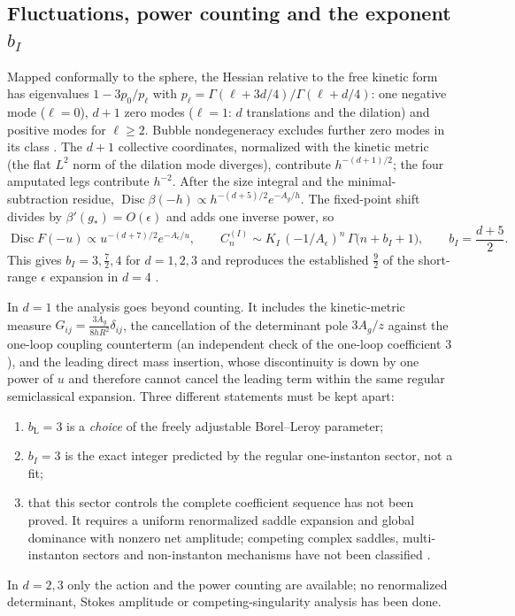\documentclass[11pt,a4paper]{article}
\numberwithin{equation}{section}
\newcommand{\Ae}{A_\epsilon}
\newcommand{\Ag}{A_g}
\newcommand{\bL}{b_{\mathrm L}}
\newcommand{\Disc}{\operatorname{Disc}}
\begin{document}
\subsection{\texorpdfstring{Fluctuations, power counting and the exponent $b_I$}{Fluctuations, power counting and the exponent b\_I}}
Mapped conformally to the sphere, the Hessian relative to the free kinetic form has
eigenvalues $1-3p_0/p_\ell$ with $p_\ell=\Gamma(\ell+3d/4)/\Gamma(\ell+d/4)$: one
negative mode ($\ell=0$), $d+1$ zero modes ($\ell=1$: $d$ translations and the dilation)
and positive modes for $\ell\ge2$. Bubble nondegeneracy excludes further zero modes in
its class \cite{Davila2013}. The $d+1$ collective coordinates, normalized with the
kinetic metric (the flat $L^2$ norm of the dilation mode diverges), contribute
$h^{-(d+1)/2}$; the four amputated legs contribute $h^{-2}$. After the size integral and
the minimal-subtraction residue, $\Disc\beta(-h)\propto h^{-(d+5)/2}e^{-\Ag/h}$. The
fixed-point shift divides by $\beta'(g_*)=O(\epsilon)$ and adds one inverse power, so
\begin{equation}
 \Disc F(-u)\propto u^{-(d+7)/2}e^{-\Ae/u},\qquad
 C_n^{(I)}\sim K_I\,(-1/\Ae)^n\,\Gamma\bigl(n+b_I+1\bigr),\qquad
 b_I=\frac{d+5}{2}.
 \label{eq:bI}
\end{equation}
This gives $b_I=3,\frac72,4$ for $d=1,2,3$ and reproduces the established $\frac92$ of the
short-range $\epsilon$ expansion in $d=4$ \cite{McKane:2018ocs,Kompaniets:2017yct}.

In $d=1$ the analysis goes beyond counting. It includes the kinetic-metric measure
$G_{ij}=\frac{3\Ag}{8hR^2}\delta_{ij}$, the cancellation of the determinant pole
$3\Ag/z$ against the one-loop coupling counterterm (an independent check of the one-loop
coefficient $3$), and the leading direct mass insertion, whose discontinuity is down by
one power of $u$ and therefore cannot cancel the leading term within the same regular
semiclassical expansion. Three different statements must be kept apart:
\begin{enumerate}
\item $\bL=3$ is a \emph{choice} of the freely adjustable Borel--Leroy parameter;
\item $b_I=3$ is the exact integer predicted by the regular one-instanton sector, not a
fit;
\item that this sector controls the complete coefficient sequence has not been proved. It
requires a uniform renormalized saddle expansion and global dominance with nonzero net
amplitude; competing complex saddles, multi-instanton sectors and non-instanton
mechanisms have not been classified \cite{Dunne:2021lie}.
\end{enumerate}
In $d=2,3$ only the action and the power counting are available; no renormalized
determinant, Stokes amplitude or competing-singularity analysis has been done.
\end{document}
